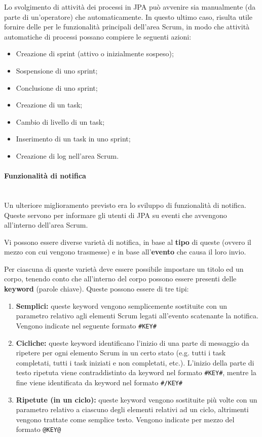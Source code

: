 Lo svolgimento di attività dei processi in JPA può avvenire sia manualmente
(da parte di un'operatore) che automaticamente. In questo ultimo caso, risulta
utile fornire delle  per le funzionalità principali dell'area Scrum,
in modo che attività automatiche di processi possano compiere le seguenti
azioni:

\begin{itemize}
\item Creazione di sprint (attivo o inizialmente sospeso);
\item Sospensione di uno sprint;
\item Conclusione di uno sprint;
\item Creazione di un task;
\item Cambio di livello di un task;
\item Inserimento di un task in uno sprint;
\item Creazione di log nell'area Scrum.
\end{itemize}

\paragraph{Funzionalità di notifica} \mbox{} \\

Un ulteriore miglioramento previsto era lo sviluppo di funzionalità di
notifica. Queste servono per informare gli utenti di JPA su eventi che
avvengono all'interno dell'area Scrum.

Vi possono essere diverse varietà di notifica, in base al \textbf{tipo} di
queste (ovvero il mezzo con cui vengono trasmesse) e in base
all'\textbf{evento} che causa il loro invio.

Per ciascuna di queste varietà deve essere possibile impostare un titolo ed un
corpo, tenendo conto che all'interno del corpo possono essere presenti delle
\textbf{keyword} (parole chiave). Queste possono essere di tre tipi:

\begin{enumerate}
\item \textbf{Semplici:} queste keyword vengono semplicemente sostituite con un
  parametro relativo agli elementi Scrum legati all'evento scatenante la
  notifica. Vengono indicate nel seguente formato \texttt{\#KEY\#}
\item \textbf{Cicliche:} queste keyword identificano l'inizio di una parte di
  messaggio da ripetere per ogni elemento Scrum in un certo stato (e.g. tutti
  i task completati, tutti i task iniziati e non completati, etc.). L'inizio
  della parte di testo ripetuta viene contraddistinto da keyword nel formato
  \texttt{\#KEY\#}, mentre la fine viene identificata da keyword nel formato
  \texttt{\#/KEY\#}
\item \textbf{Ripetute (in un ciclo):} queste keyword vengono sostituite più
  volte con un parametro relativo a ciascuno degli elementi relativi ad un
  ciclo, altrimenti vengono trattate come semplice testo. Vengono indicate per
  mezzo del formato \texttt{@KEY@}
\end{enumerate}

